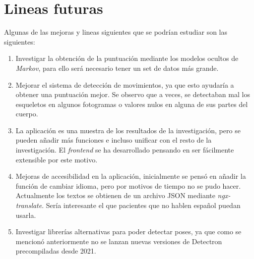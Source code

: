 \section{Lineas futuras}
Algunas de las mejoras y lineas siguientes que se podrían estudiar son las siguientes:
\begin{enumerate}
	\item Investigar la obtención de la puntuación mediante los modelos ocultos de \textit{Markov}, para ello será necesario tener un set de datos más grande.
	\item Mejorar el sistema de detección de movimientos, ya que esto ayudaría a obtener una puntuación mejor. Se observo que a veces, se detectaban mal los esqueletos en algunos fotogramas o valores nulos en alguna de sus partes del cuerpo.
	\item La aplicación es una muestra de los resultados de la investigación, pero se pueden añadir más funciones e incluso unificar con el resto de la investigación.  El \textit{frontend} se ha desarrollado pensando en ser fácilmente extensible por este motivo.
	\item Mejoras de accesibilidad en la aplicación, inicialmente se pensó en añadir la función de cambiar idioma, pero por motivos de tiempo no se pudo hacer. Actualmente los textos se obtienen de un archivo JSON mediante \textit{ngx-translate}. Sería interesante el que pacientes que no hablen español puedan usarla.
	\item Investigar librerías alternativas para poder detectar poses, ya que como se mencionó anteriormente no se lanzan nuevas versiones de Detectron precompiladas desde 2021.
	
	
\end{enumerate}
